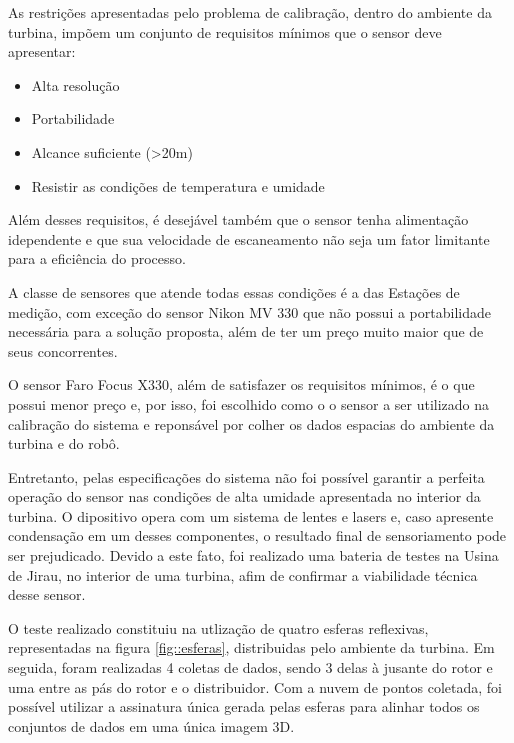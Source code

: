 As restrições apresentadas pelo problema de calibração, dentro do ambiente da
turbina, impõem um conjunto de requisitos mínimos que o sensor deve apresentar:

\begin{itemize}
  \item Alta resolução
  \item Portabilidade
  \item Alcance suficiente (>20m)
  \item Resistir as condições de temperatura e umidade 
\end{itemize}

Além desses requisitos, é desejável também que o sensor tenha alimentação
idependente e que sua velocidade de escaneamento não seja um fator limitante
para a eficiência do processo.

A classe de sensores que atende todas essas condições é a das Estações de
medição, com exceção do sensor Nikon MV 330 que não possui a portabilidade
necessária para a solução proposta, além de ter um preço muito maior que de seus
concorrentes.

O sensor Faro Focus X330, além de satisfazer os requisitos mínimos, é o que
possui menor preço e, por isso, foi escolhido como o o sensor a ser utilizado na
calibração do sistema e reponsável por colher os dados espacias do ambiente da
turbina e do robô. 

Entretanto, pelas especificações do sistema não foi possível garantir a perfeita
operação do sensor nas condições de alta umidade apresentada no interior da
turbina. O dipositivo opera com um sistema de lentes e lasers e, caso apresente
condensação em um desses componentes, o resultado final de sensoriamento pode
ser prejudicado. Devido a este fato, foi realizado uma bateria de testes na
Usina de Jirau, no interior de uma turbina, afim de confirmar a viabilidade
técnica desse sensor.

O teste realizado constituiu na utlização de quatro esferas reflexivas,
representadas na figura \ref{fig::esferas}, distribuidas pelo ambiente da
turbina.
Em seguida, foram realizadas 4 coletas de dados, sendo 3 delas à jusante do
rotor e uma entre as pás do rotor e o distribuidor. Com a nuvem de pontos
coletada, foi possível utilizar a assinatura única gerada pelas esferas para
alinhar todos os conjuntos de dados em uma única imagem 3D.

